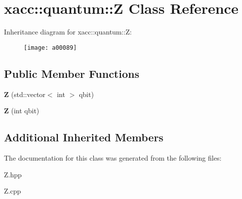 \hypertarget{a00089}{}\section{xacc\+:\+:quantum\+:\+:Z Class Reference}
\label{a00089}
Inheritance diagram for xacc\+:\+:quantum\+:\+:Z\+:\begin{figure}[H]
\begin{center}
\leavevmode
\texttt{[image: a00089]}
\end{center}
\end{figure}
\subsection*{Public Member Functions}
\begin{DoxyCompactItemize}
\item 
{\bfseries Z} (std\+::vector$<$ int $>$ qbit)\hypertarget{a00089_a5f1d311b357faed8c2665fe20cf24aeb}{}\label{a00089_a5f1d311b357faed8c2665fe20cf24aeb}

\item 
{\bfseries Z} (int qbit)\hypertarget{a00089_aa1bb7e533e7595e9ecd06879a2f8d2de}{}\label{a00089_aa1bb7e533e7595e9ecd06879a2f8d2de}

\end{DoxyCompactItemize}
\subsection*{Additional Inherited Members}


The documentation for this class was generated from the following files\+:\begin{DoxyCompactItemize}
\item 
Z.\+hpp\item 
Z.\+cpp\end{DoxyCompactItemize}
